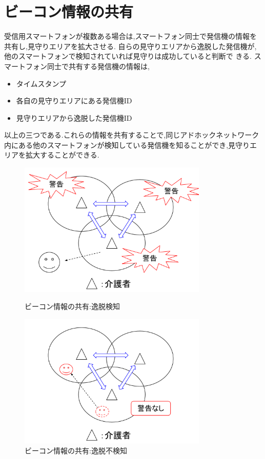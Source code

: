 \newpage

\section{ビーコン情報の共有}
受信用スマートフォンが複数ある場合は,スマートフォン同士で発信機の情報を共有し,見守りエリアを拡大させる.
自らの見守りエリアから逸脱した発信機が,他のスマートフォンで検知されていれば見守りは成功していると判断で
きる.
スマートフォン同士で共有する発信機の情報は,

\begin{itemize}
\item タイムスタンプ
\item 各自の見守りエリアにある発信機ID
\item 見守りエリアから逸脱した発信機ID
\end{itemize}

以上の三つである.これらの情報を共有することで,同じアドホックネットワーク内にある他のスマートフォンが検知している発信機を知ることができ,見守りエリアを拡大することができる.


\begin{figure}[htbp]
  \begin{minipage}{0.5\hsize}
\includegraphics[width=9cm]{fig/share.pdf}
\caption{ビーコン情報の共有:逸脱検知}
  \end{minipage}
  \begin{minipage}{0.5\hsize}
  \centering
  \includegraphics[width=9cm]{fig/fig2.pdf}
  \caption{ビーコン情報の共有:逸脱不検知}
  \end{minipage}
\end{figure}
